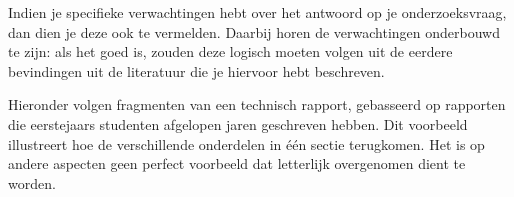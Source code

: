 \documentclass{article}
\begin{document}
Indien je specifieke verwachtingen hebt over het antwoord op je onderzoeksvraag, dan dien je deze ook te vermelden. Daarbij horen de verwachtingen onderbouwd te zijn: als het goed is, zouden deze logisch moeten volgen uit de eerdere bevindingen uit de literatuur die je hiervoor hebt beschreven.

Hieronder volgen fragmenten van een technisch rapport, gebasseerd op rapporten die eerstejaars studenten afgelopen jaren geschreven hebben. Dit voorbeeld illustreert hoe de verschillende onderdelen in één sectie terugkomen. Het is op andere aspecten geen perfect voorbeeld dat letterlijk overgenomen dient te worden.
\end{document}
